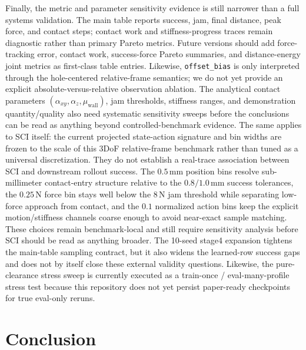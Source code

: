 ﻿\documentclass[11pt]{article}
\newcommand{\code}[1]{\nolinkurl{#1}}
\newcommand{\mm}{\ensuremath{\mathrm{mm}}}
\newcommand{\N}{\ensuremath{\mathrm{N}}}
\begin{document}
Finally, the metric and parameter sensitivity evidence is still narrower than a full systems
validation. The main table reports success, jam, final distance, peak force, and contact steps;
contact work and stiffness-progress traces remain diagnostic rather than primary Pareto metrics.
Future versions should add force-tracking error, contact work, success-force Pareto summaries, and
distance-energy joint metrics as first-class table entries. Likewise, \code{offset\_bias} is only
interpreted through the hole-centered relative-frame semantics; we do not yet provide an explicit
absolute-versus-relative observation ablation. The analytical contact parameters
$(\alpha_{xy}, \alpha_z, \mu_{\mathrm{wall}})$, jam thresholds, stiffness ranges, and demonstration
quantity/quality also need systematic sensitivity sweeps before the conclusions can be read as
anything beyond controlled-benchmark evidence. The same applies to SCI itself: the current
projected state-action signature and bin widths are frozen to the scale of this 3DoF relative-frame
benchmark rather than tuned as a universal discretization. They do not establish a real-trace
association between SCI and downstream rollout success. The $0.5\,\mm$ position bins resolve
sub-millimeter contact-entry structure relative to the $0.8/1.0\,\mm$ success tolerances, the
$0.25\,\N$ force bin stays well below the $8\,\N$ jam threshold while separating low-force approach
from contact, and the $0.1$ normalized action bins keep the explicit motion/stiffness channels
coarse enough to avoid near-exact sample matching. These choices remain benchmark-local and still
require sensitivity analysis before SCI should be read as anything broader. The 10-seed stage4
expansion tightens the main-table sampling contract, but it also widens the learned-row success
gaps and does not by itself close these external validity questions. Likewise, the pure-clearance stress sweep is
currently executed as a train-once / eval-many-profile stress test because this repository does not
yet persist paper-ready checkpoints for true eval-only reruns.

\section{Conclusion}
\label{sec:conclusion}
\end{document}
